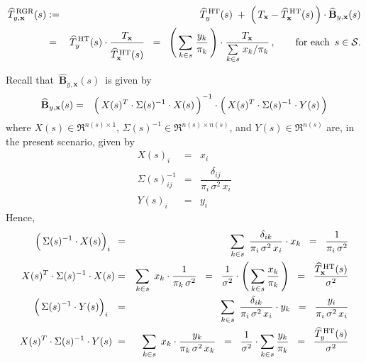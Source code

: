 \begin{proposition}
\begin{eqnarray*}
\widehat{T}^{\,\textnormal{RGR}}_{y,\mathbf{x}}(s)
& := &
	\widehat{T}^{\,\textnormal{HT}}_{y}(s)
	\; + \;
	\left(\,T_{\mathbf{x}} - \widehat{T}^{\,\textnormal{HT}}_{\mathbf{x}}(s) \,\right)
	\cdot
	\widehat{\mathbf{B}}_{y,\mathbf{x}}(s)
\\
& = &
	\widehat{T}^{\,\textnormal{HT}}_{y}(s)
	\cdot
	\dfrac{
		T_{\mathbf{x}}
		}{
		\overset{{\color{white}.}}{\widehat{T}^{\,\textnormal{HT}}_{\mathbf{x}}(s)}
		}
\;\; = \;\;
	\left(\,\underset{k \in s}{\sum}\;\dfrac{y_{k}}{\pi_{k}}\,\right)
	\cdot
 	\dfrac{
		T_{\mathbf{x}}
		}{
		\underset{k \in s}{\sum}\;x_{k}/\pi_{k}
		}
	\,,\quad\quad\textnormal{for each \,$s \in \mathcal{S}$}.
\end{eqnarray*}
\end{proposition}
\proof
Recall that \,$\widehat{\mathbf{B}}_{y,\mathbf{x}}(s)$\, is given by
\begin{eqnarray*}
\widehat{\mathbf{B}}_{y,\mathbf{x}}(s)
& = &
	\left(\,X(s)^{T} \overset{{\color{white}!}}{\cdot} \Sigma(s)^{-1} \cdot X(s)\,\right)^{-1}
	\cdot
	\left(\,X(s)^{T} \overset{{\color{white}!}}{\cdot} \Sigma(s)^{-1} \cdot Y(s) \,\right)
\end{eqnarray*}
where $X(s) \in \Re^{n(s) \times 1}$, $\Sigma(s)^{-1} \in \Re^{n(s) \times n(s)}$, and $Y(s) \in \Re^{n(s)}$
are, in the present scenario, given by
\begin{eqnarray*}
X(s)_{i}
& = &
	x_{i}
\\
\Sigma(s)^{-1}_{ij}
& = &
	\dfrac{\delta_{ij}}{\pi_{i}\,\sigma^{2}\,x_{i}}
\\
Y(s)_{i}
& = &
	y_{i}
\end{eqnarray*}
Hence,
\begin{eqnarray*}
\left(\,\Sigma(s)^{-1} \overset{{\color{white}!}}{\cdot} X(s)\right)_{i}{\color{white}!}
& = &
	\underset{k \in s}{\sum}\;\,
	\dfrac{\delta_{ik}}{\pi_{i}\,\sigma^{2}\,x_{i}} \cdot x_{k}
\;\; = \;\;
	\dfrac{1}{\pi_{i}\,\sigma^{2}}
\\
X(s)^{T}\cdot\Sigma(s)^{-1} \overset{{\color{white}!}}{\cdot} X(s)
& = &
	\underset{k \in s}{\sum}\;\,
	x_{k} \cdot \dfrac{1}{\pi_{k}\,\sigma^{2}}
\;\; = \;\;
	\dfrac{1}{\sigma^{2}}
	\cdot
	\left(\,\underset{k \in s}{\sum}\,\dfrac{x_{k}}{\pi_{k}}\,\right)
\;\; = \;\;
	\dfrac{\widehat{T}^{\,\textnormal{HT}}_{\mathbf{x}}(s)}{\sigma^{2}}
\\
\left(\,\Sigma(s)^{-1} \overset{{\color{white}!}}{\cdot} Y(s)\right)_{i}{\color{white}1}
& = &
	\underset{k \in s}{\sum}\;\,
	\dfrac{\delta_{ik}}{\pi_{i}\,\sigma^{2}\,x_{i}}
	\cdot
	y_{k}
\;\; = \;\;
	\dfrac{y_{i}}{\pi_{i}\,\sigma^{2}\,x_{i}}
\\
X(s)^{T}\cdot\Sigma(s)^{-1} \overset{{\color{white}!}}{\cdot} Y(s){\color{white}!}
& = &
	\underset{k \in s}{\sum}\;\,
	x_{k} \cdot \dfrac{y_{k}}{\pi_{k}\,\sigma^{2}\,x_{k}}
\;\; = \;\;
	\dfrac{1}{\sigma^{2}}
	\cdot
	\underset{k \in s}{\sum}\, \dfrac{y_{k}}{\pi_{k}}
\;\; = \;\;
	\dfrac{\widehat{T}^{\,\textnormal{HT}}_{y}(s)}{\sigma^{2}}
\end{eqnarray*}
